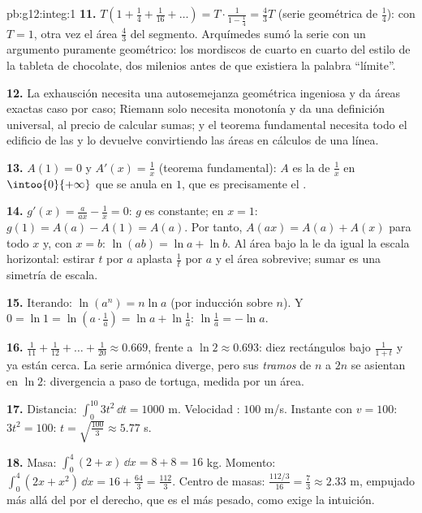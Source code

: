 \begin{solution}{pb:g12:integ:1}
\textbf{11.} $T\left(1 + \frac14 + \frac{1}{16} + \dots\right) =
T \cdot \frac{1}{1 - \frac14} = \frac43 T$ (serie geométrica de 
$\frac14$): con $T = 1$, otra vez el área $\frac43$ del segmento.
Arquímedes sumó la serie con un argumento puramente geométrico: los
mordiscos de cuarto en cuarto del estilo de la tableta de chocolate, dos
milenios antes de que existiera la palabra ``límite''.

\textbf{12.} La exhausción necesita una autosemejanza geométrica ingeniosa
y da áreas exactas caso por caso; Riemann solo necesita monotonía y da una
definición universal, al precio de calcular sumas; y el teorema fundamental
necesita todo el edificio de las  y lo devuelve convirtiendo las
áreas en cálculos de una línea.

\textbf{13.} $A(1) = 0$ y $A'(x) = \frac1x$ (teorema fundamental): $A$ es
la  de $\frac1x$ en $\intoo{0}{+\infty}$ que se anula en $1$, que
es precisamente el .

\textbf{14.} $g'(x) = \frac{a}{ax} - \frac1x = 0$: $g$ es constante; en
$x = 1$: $g(1) = A(a) - A(1) = A(a)$. Por tanto,
$A(ax) = A(a) + A(x)$ para todo $x$ y, con $x = b$:
$\ln(ab) = \ln a + \ln b$. Al área bajo la  le da igual la escala
horizontal: estirar $t$ por $a$ aplasta $\frac1t$ por $a$ y el área
sobrevive; sumar  es una simetría de escala.

\textbf{15.} Iterando: $\ln(a^n) = n\ln a$ (por inducción sobre $n$). Y
$0 = \ln 1 = \ln\left(a \cdot \frac1a\right) = \ln a + \ln\frac1a$:
$\ln\frac1a = -\ln a$.

\textbf{16.} $\frac{1}{11} + \frac{1}{12} + \dots + \frac{1}{20} \approx
0.669$, frente a $\ln 2 \approx 0.693$: diez rectángulos bajo
$\frac{1}{1+t}$ y ya están cerca. La serie armónica diverge, pero sus
\emph{tramos} de $n$ a $2n$ se asientan en $\ln 2$: divergencia a paso de
tortuga, medida por un área.

\textbf{17.} Distancia: $\int_0^{10} 3t^2\,\dd t = 1000$ m. Velocidad
: $100$ m/s. Instante con $v = 100$: $3t^2 = 100$:
$t = \sqrt{\frac{100}{3}} \approx 5.77$ s.

\textbf{18.} Masa: $\int_0^4 (2 + x)\,\dd x = 8 + 8 = 16$ kg. Momento:
$\int_0^4 (2x + x^2)\,\dd x = 16 + \frac{64}{3} = \frac{112}{3}$. Centro de
masas: $\frac{112/3}{16} = \frac73 \approx 2.33$ m, empujado más allá del
 por el  derecho, que es el más pesado, como exige la
intuición.


\end{solution}
